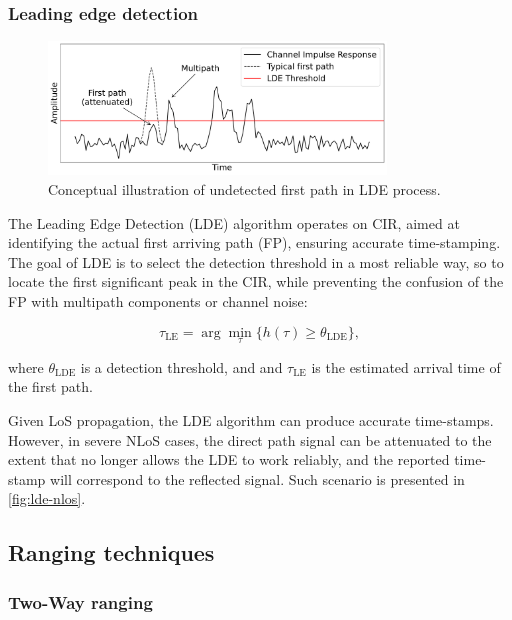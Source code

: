 \subsubsection{Leading edge detection}\label{lde}

\begin{figure}[tbh]
\includegraphics[width=0.8\textwidth]{Graphics/uwb_lde_error.pdf}
\centering
\caption{Conceptual illustration of undetected first path in LDE process.}
\label{fig:lde-nlos}
\end{figure}

The Leading Edge Detection (LDE) algorithm operates on CIR, aimed at identifying the actual first arriving path (FP), ensuring accurate time-stamping. The goal of LDE is to select the detection threshold in a most reliable way, so to locate the first significant peak in the CIR, while preventing the confusion of the FP with multipath components or channel noise:

\begin{equation}
\tau_{\text{LE}} = \arg \min_{\tau} \{ h(\tau) \geq \theta_{\text{LDE}} \},
\end{equation}

where $\theta_{\text{LDE}}$ is a detection threshold, and and $\tau_{\text{LE}}$ is the estimated arrival time of the first path.


Given LoS propagation, the LDE algorithm can produce accurate time-stamps. However, in severe NLoS cases, the direct path signal can be attenuated to the extent that no longer allows the LDE to work reliably, and the reported time-stamp will correspond to the reflected signal. Such scenario is presented in \autoref{fig:lde-nlos}.

\subsection{Ranging techniques}
\subsubsection{Two-Way ranging}\label{theory:twr}

